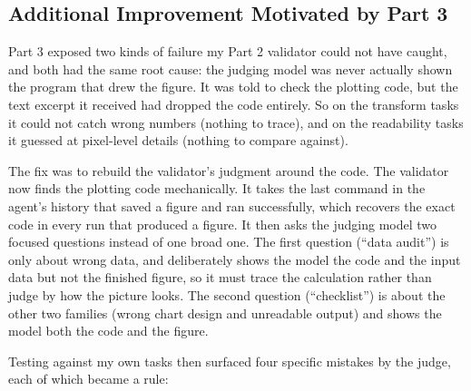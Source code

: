 \documentclass[11pt]{article}
\begin{document}
\subsection{Additional Improvement Motivated by Part 3}

Part 3 exposed two kinds of failure my Part 2 validator could not have caught, and both had the same root cause: the judging model was never actually shown the program that drew the figure. It was told to check the plotting code, but the text excerpt it received had dropped the code entirely. So on the transform tasks it could not catch wrong numbers (nothing to trace), and on the readability tasks it guessed at pixel-level details (nothing to compare against).

The fix was to rebuild the validator's judgment around the code. The validator now finds the plotting code mechanically. It takes the last command in the agent's history that saved a figure and ran successfully, which recovers the exact code in every run that produced a figure. It then asks the judging model two focused questions instead of one broad one. The first question (``data audit'') is only about wrong data, and deliberately shows the model the code and the input data but not the finished figure, so it must trace the calculation rather than judge by how the picture looks. The second question (``checklist'') is about the other two families (wrong chart design and unreadable output) and shows the model both the code and the figure.

Testing against my own tasks then surfaced four specific mistakes by the judge, each of which became a rule:
\end{document}
